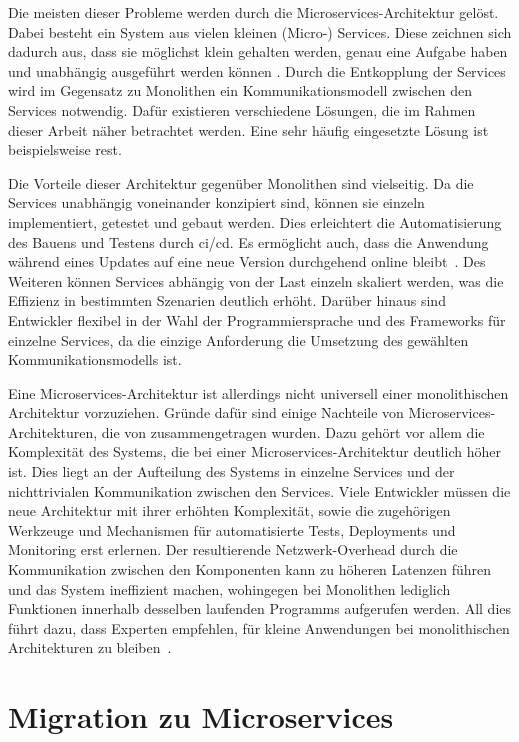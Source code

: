 Die meisten dieser Probleme werden durch die Microservices-Architektur gelöst.
Dabei besteht ein System aus vielen kleinen (Micro-) Services.
Diese zeichnen sich dadurch aus, dass sie möglichst klein gehalten werden, genau eine Aufgabe haben und unabhängig ausgeführt werden können \cite{a-survey-on}.
Durch die Entkopplung der Services wird im Gegensatz zu Monolithen ein Kommunikationsmodell zwischen den Services notwendig.
Dafür existieren verschiedene Lösungen, die im Rahmen dieser Arbeit näher betrachtet werden.
Eine sehr häufig eingesetzte Lösung ist beispielsweise \gls{rest}.

Die Vorteile dieser Architektur gegenüber Monolithen sind vielseitig.
Da die Services unabhängig voneinander konzipiert sind, können sie einzeln implementiert, getestet und gebaut werden.
Dies erleichtert die Automatisierung des Bauens und Testens durch \gls{ci}/\gls{cd}.
Es ermöglicht auch, dass die Anwendung während eines Updates auf eine neue Version durchgehend online bleibt~\cite{a-survey-on}.
Des Weiteren können Services abhängig von der Last einzeln skaliert werden, was die Effizienz in bestimmten Szenarien deutlich erhöht.
Darüber hinaus sind Entwickler flexibel in der Wahl der Programmiersprache und des Frameworks für einzelne Services, da die einzige Anforderung die Umsetzung des gewählten Kommunikationsmodells ist.

Eine Microservices-Architektur ist allerdings nicht universell einer monolithischen Architektur vorzuziehen.
Gründe dafür sind einige Nachteile von Microservices-Architekturen, die von  zusammengetragen wurden.
Dazu gehört vor allem die Komplexität des Systems, die bei einer Microservices-Architektur deutlich höher ist.
Dies liegt an der Aufteilung des Systems in einzelne Services und der nichttrivialen Kommunikation zwischen den Services.
Viele Entwickler müssen die neue Architektur mit ihrer erhöhten Komplexität, sowie die zugehörigen Werkzeuge und Mechanismen für automatisierte Tests, Deployments und Monitoring erst erlernen.
Der resultierende Netzwerk-Overhead durch die Kommunikation zwischen den Komponenten kann zu höheren Latenzen führen und das System ineffizient machen, wohingegen bei Monolithen lediglich Funktionen innerhalb desselben laufenden Programms aufgerufen werden.
All dies führt dazu, dass Experten empfehlen, für kleine Anwendungen bei monolithischen Architekturen zu bleiben~\cite{a-survey-on}\cite{7742218}.

\section{Migration zu Microservices}

